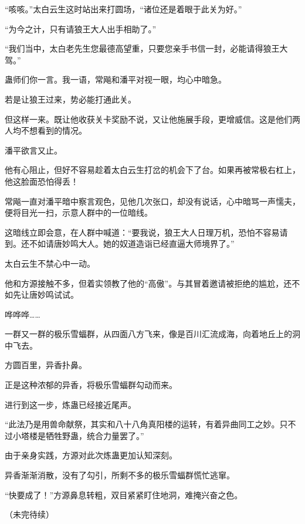 \begin{this_body}
“咳咳。”太白云生这时站出来打圆场，“诸位还是着眼于此关为好。”

“为今之计，只有请狼王大人出手相助了。”

“我们当中，太白老先生您最德高望重，只要您亲手书信一封，必能请得狼王大驾。”

蛊师们你一言。我一语，常飚和潘平对视一眼，均心中暗急。

若是让狼王过来，势必能打通此关。

但这样一来。既让他收获关卡奖励不说，又让他施展手段，更增威信。这是他们两人均不想看到的情况。

潘平欲言又止。

他有心阻止，但好不容易趁着太白云生打岔的机会下了台。如果再被常极右杠上，他这脸面恐怕得丢！

常飚一直对潘平暗中察言观色，见他几次张口，却没有说话，心中暗骂一声懦夫，便将目光一扫，示意人群中的一位暗线。

这暗线立即会意，在人群中喊道：“要我说，狼王大人日理万机，恐怕不容易请到。还不如请唐妙鸣大人。她的奴道造诣已经直逼大师境界了。”

太白云生不禁心中一动。

他和方源接触不多，但着实领教了他的“高傲”。与其冒着邀请被拒绝的尴尬，还不如先让唐妙鸣试试。

哗哗哗……

一群又一群的极乐雪蝠群，从四面八方飞来，像是百川汇流成海，向着地丘上的洞中飞去。

方圆百里，异香扑鼻。

正是这种浓郁的异香，将极乐雪蝠群勾动而来。

进行到这一步，炼蛊已经接近尾声。

“此法乃是用兽命献祭，其实和八十八角真阳楼的运转，有着异曲同工之妙。只不过小塔楼是牺牲野蛊，统合力量罢了。”

由于亲身实践，方源对此次炼蛊更加认知深刻。

异香渐渐消散，没有了勾引，所剩不多的极乐雪蝠群慌忙逃窜。

“快要成了！”方源鼻息转粗，双目紧紧盯住地洞，难掩兴奋之色。

（未完待续）

\end{this_body}

